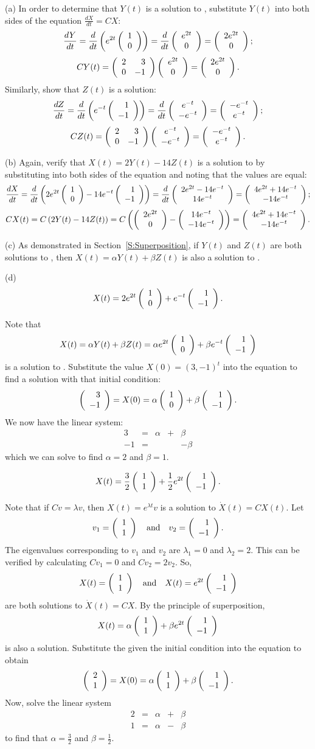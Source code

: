\documentclass{ximera}
\begin{document}
(a) In order to determine that $Y(t)$ is a solution
to , substitute $Y(t)$ into both sides of the 
equation $\frac{dX}{dt} = CX$:
\[
\frac{dY}{dt}
= \frac{d}{dt}\left(e^{2t}\left(\begin{array}{r} 1 \\ 0\end{array}\right)\right)
= \frac{d}{dt}\left(\begin{array}{c} e^{2t} \\ 0\end{array}\right)
= \left(\begin{array}{c} 2e^{2t} \\ 0\end{array}\right);
\]
\[
CY(t)
= \left(\begin{array}{rr} 2 & 3\\ 0 &-1\end{array}\right)\left(\begin{array}{c} e^{2t} \\ 0\end{array}\right)
= \left(\begin{array}{c} 2e^{2t} \\ 0\end{array}\right).
\]
Similarly, show that $Z(t)$ is a solution:
\[
\frac{dZ}{dt}
= \frac{d}{dt}\left(e^{-t}\left(\begin{array}{r} 1 \\ -1\end{array}\right)\right)
= \frac{d}{dt}\left(\begin{array}{c} e^{-t} \\ -e^{-t}\end{array}\right)
= \left(\begin{array}{c} -e^{-t} \\ e^{-t}\end{array}\right);
\]
\[
CZ(t)
= \left(\begin{array}{rr} 2 & 3\\ 0 &-1\end{array}\right)\left(\begin{array}{c} e^{-t} \\ -e^{-t}\end{array}\right)
= \left(\begin{array}{c} -e^{-t} \\ e^{-t}\end{array}\right).
\]

(b) Again, verify that $X(t) = 2Y(t) - 14Z(t)$ is a solution to
 by substituting into both sides of the equation and
noting that the values are equal:
\[
\frac{dX}{dt}
= \frac{d}{dt}\left(2e^{2t}\left(\begin{array}{r} 1 \\ 0\end{array}\right) - 14e^{-t}\left(\begin{array}{r} 1 \\ -1\end{array}\right)\right)
= \frac{d}{dt}\left(\begin{array}{c} 2e^{2t} - 14e^{-t} \\ 14e^{-t}\end{array}\right) 
= \left(\begin{array}{c} 4e^{2t} + 14e^{-t} \\ -14e^{-t}\end{array}\right);
\]
\[
CX(t) = C\left(2Y(t) - 14Z(t)\right)
= C\left(\left(\begin{array}{c} 2e^{2t} \\ 0\end{array}\right) - \left(\begin{array}{c} 14e^{-t} \\ -14e^{-t}\end{array}\right)\right)
= \left(\begin{array}{c} 4e^{2t} + 14e^{-t} \\ -14e^{-t}\end{array}\right).
\]

(c) As demonstrated in Section~\ref{S:Superposition}, if
$Y(t)$ and $Z(t)$ are both solutions to
, then $X(t) = \alpha Y(t) + \beta Z(t)$ is also
a solution to .

(d) \ans 
\[
X(t) = 2e^{2t}\left(\begin{array}{r} 1 \\ 0\end{array}\right) + e^{-t}\left(\begin{array}{r} 1 \\ -1\end{array}\right).
\]

\soln Note that
\[ X(t) = \alpha Y(t) + \beta Z(t) = \alpha e^{2t}\left(\begin{array}{r} 1 \\ 0\end{array}\right)
+ \beta e^{-t}\left(\begin{array}{r} 1 \\ -1\end{array}\right) \]
is a solution to .  Substitute the value
$X(0) = (3,-1)^t$  into the equation to find a solution with that
initial condition:
\[
\left(\begin{array}{r} 3 \\ -1\end{array}\right) = X(0) = \alpha\left(\begin{array}{r} 1 \\ 0\end{array}\right) +
\beta\left(\begin{array}{r} 1 \\ -1\end{array}\right).
\]
We now have the linear system:
\[ \begin{array}{rrrrr}
3 & = & \alpha & + & \beta \\
-1 & = & & & -\beta \end{array} \]
which we can solve to find $\alpha = 2$ and $\beta = 1$.


\ans 
\[
X(t) = \frac{3}{2}\left(\begin{array}{r} 1 \\ 1\end{array}\right) + \frac{1}{2}e^{2t}\left(\begin{array}{r} 1 \\ -1\end{array}\right).
\]

\soln Note that if $Cv = \lambda v$, then $X(t) = e^{\lambda t}v$ is a
solution to $\dot{X}(t) = CX(t)$.  Let
\[
v_1 = \left(\begin{array}{r} 1 \\ 1\end{array}\right) \quad\mbox{and}\quad v_2 = \left(\begin{array}{r} 1 \\ -1\end{array}\right).
\]
The eigenvalues corresponding to $v_1$ and $v_2$ are
$\lambda_1 = 0$ and $\lambda_2 = 2$.  This can be verified
by calculating $Cv_1 = 0$ and $Cv_2 = 2v_2$.
So,
\[
X(t) = \left(\begin{array}{r} 1 \\ 1\end{array}\right) \quad\mbox{and}\quad X(t) = e^{2t}\left(\begin{array}{r} 1 \\ -1\end{array}\right)
\]
are both solutions to $\dot{X}(t) = CX$.  By the principle of
superposition,
\[
X(t) = \alpha\left(\begin{array}{r} 1 \\ 1\end{array}\right) + \beta e^{2t}\left(\begin{array}{r} 1 \\ -1\end{array}\right)
\]
is also a solution.
Substitute the given the initial condition into the equation to obtain
\[
\left(\begin{array}{r} 2 \\ 1\end{array}\right) = X(0) = \alpha\left(\begin{array}{r} 1 \\ 1\end{array}\right) + \beta\left(\begin{array}{r} 1 \\ -1\end{array}\right).
\]
Now, solve the linear system
\[
\begin{array}{rrrrr}
2 & = & \alpha & + & \beta \\
1 & = & \alpha & - & \beta \end{array}
\]
to find that $\alpha = \frac{3}{2}$ and $\beta = \frac{1}{2}$.
\end{document}
